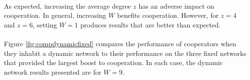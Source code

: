 \documentclass{article}
\begin{document}
	\paragraph{}As expected, increasing the average degree $z$ has an adverse impact on cooperation.  In general, increasing $W$ benefits cooperation.  However, for $z=4$ and $z=6$, setting $W=1$ produces results that are better than expected.
	\newpage

	\paragraph{}Figure \ref{fig:compdynamicfixed} compares the performance of cooperators when they inhabit a dynamic network to their performance on the three fixed networks that provided the largest boost to cooperation.  In each case, the dynamic network results presented are for $W=9$.
\end{document}
